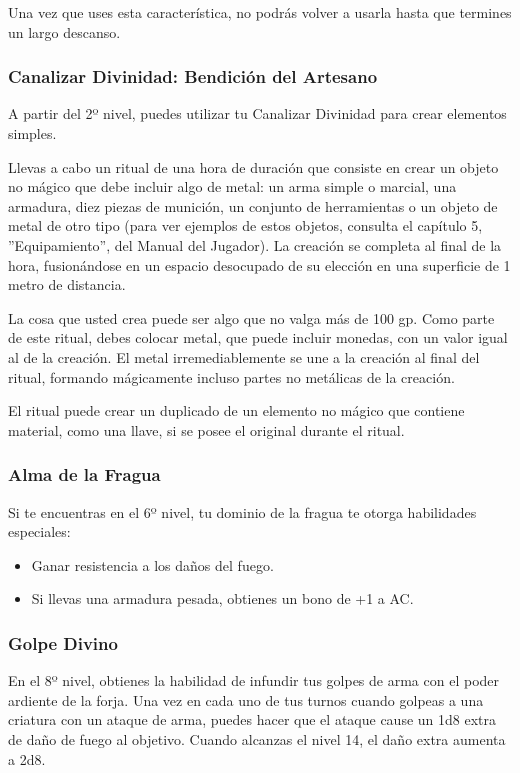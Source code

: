 \documentclass[a4paper,twocolumn,openany,10pt]{dndbook}
\begin{document}
Una vez que uses esta característica, no podrás volver a usarla hasta que termines un largo descanso. 

\subsubsection{Canalizar Divinidad:  Bendición del Artesano}
A partir del 2º nivel, puedes utilizar tu Canalizar Divinidad para crear elementos simples.

Llevas a cabo un ritual de una hora de duración que consiste en crear un objeto no mágico que debe incluir algo de metal: un
arma simple o marcial, una armadura, diez piezas de munición, un conjunto de herramientas o un objeto de metal de otro tipo
(para ver ejemplos de estos objetos, consulta el capítulo 5, ''Equipamiento'', del Manual del Jugador). La creación se completa
al final de la hora, fusionándose en un espacio desocupado de su elección en una superficie de 1 metro de distancia.

La cosa que usted crea puede ser algo que no valga más de 100 gp. Como parte de este ritual, debes colocar metal, que puede
incluir monedas, con un valor igual al de la creación. El metal irremediablemente se une a la creación al final del ritual,
formando mágicamente incluso partes no metálicas de la creación.

El ritual puede crear un duplicado de un elemento no mágico que contiene material, como una llave, si se posee el original
durante el ritual. 

\subsubsection{Alma de la Fragua}
Si te encuentras en el 6º nivel, tu dominio de la fragua te otorga habilidades especiales:
\begin{itemize}
\item Ganar resistencia a los daños del fuego.
\item Si llevas una armadura pesada, obtienes un bono de +1 a AC.
\end{itemize}

\subsubsection{Golpe Divino}
En el 8º nivel, obtienes la habilidad de infundir tus golpes de arma con el poder ardiente de la forja. Una vez en cada uno de
tus turnos cuando golpeas a una criatura con un ataque de arma, puedes hacer que el ataque cause un 1d8 extra de daño de fuego
al objetivo. Cuando alcanzas el nivel 14, el daño extra aumenta a 2d8.
\end{document}
